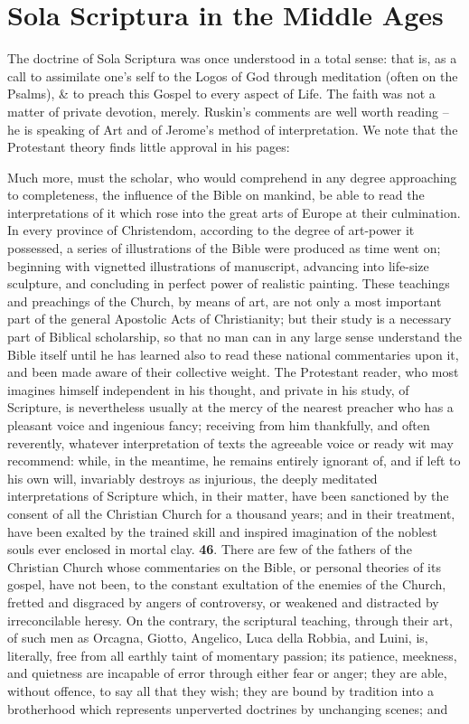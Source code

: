 \section{Sola Scriptura in the Middle Ages}

The doctrine of Sola Scriptura was once understood in a total sense: that is, as a call to assimilate one's self to the Logos of God through meditation (often on the Psalms), \& to preach this Gospel to every aspect of Life. The faith was not a matter of private devotion, merely. Ruskin's comments are well worth reading -- he is speaking of Art and of Jerome's method of interpretation. We note that the Protestant theory finds little approval in his pages:

\begin{quotationx}
Much more, must the scholar, who would comprehend in any degree approaching to completeness, the influence of the Bible on mankind, be able to read the interpretations of it which rose into the great arts of Europe at their culmination. In every province of Christendom, according to the degree of art-power it possessed, a series of illustrations of the Bible were produced as time went on; beginning with vignetted illustrations of manuscript, advancing into life-size sculpture, and concluding in perfect power of realistic painting. These teachings and preachings of the Church, by means of art, are not only a most important part of the general Apostolic Acts of Christianity; but their study is a necessary part of Biblical scholarship, so that no man can in any large sense understand the Bible itself until he has learned also to read these national commentaries upon it, and been made aware of their collective weight. The Protestant reader, who most imagines himself independent in his thought, and private in his study, of Scripture, is nevertheless usually at the mercy of the nearest preacher who has a pleasant voice and ingenious fancy; receiving from him thankfully, and often reverently, whatever interpretation of texts the agreeable voice or ready wit may recommend: while, in the meantime, he remains entirely ignorant of, and if left to his own will, invariably destroys as injurious, the deeply meditated interpretations of Scripture which, in their matter, have been sanctioned by the consent of all the Christian Church for a thousand years; and in their treatment, have been exalted by the trained skill and inspired imagination of the noblest souls ever enclosed in mortal clay. \textbf{46}. There are few of the fathers of the Christian Church whose commentaries on the Bible, or personal theories of its gospel, have not been, to the constant exultation of the enemies of the Church, fretted and disgraced by angers of controversy, or weakened and distracted by irreconcilable heresy. On the contrary, the scriptural teaching, through their art, of such men as Orcagna, Giotto, Angelico, Luca della Robbia, and Luini, is, literally, free from all earthly taint of momentary passion; its patience, meekness, and quietness are incapable of error through either fear or anger; they are able, without offence, to say all that they wish; they are bound by tradition into a brotherhood which represents unperverted doctrines by unchanging scenes; and 
\end{quotationx}
